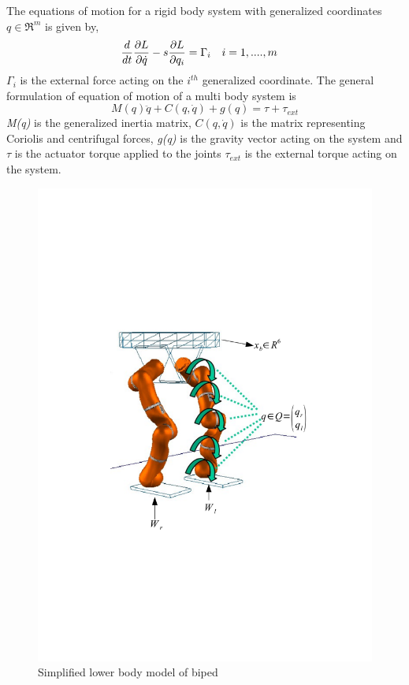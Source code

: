 The equations of motion for a rigid body system with generalized coordinates $q \in \Re^m $ is given by, 
\begin{align}
\frac{d}{dt} &\frac{\partial {L}}{\partial {\dot{q}}}-s\frac{\partial {L}}{\partial {q_i}} = \Gamma_i && i=1,....,m
\end{align}
$\Gamma_i$ is the external force acting on the $i^{th}$ generalized coordinate.
The general formulation of equation of motion of a multi body system is
\begin{equation}
\label{eq:dyn_mul_bdy}
M(q)\ddot{q}+C(q,\dot{q})+g(q) = \tau + \tau_{ext}
\end{equation}
\emph{M(q)} is the generalized inertia matrix, $C(q,\dot{q})$ is the matrix representing Coriolis and centrifugal forces, \emph{g(q)} is the gravity vector acting on the system and $\tau$ is the actuator torque applied to the joints $\tau_{ext}$ is the external torque acting on the system.
\begin{figure}
\begin{center}
\includegraphics[trim= 10mm 80mm 10mm 80mm,scale=0.75]{Bilder/model_biped.pdf}
\caption{Simplified lower body model of biped}
\label{fig:biped_simplelow}
\end{center}
\end{figure}


